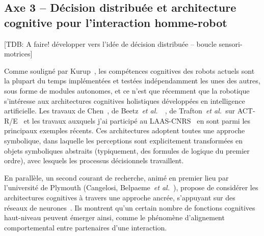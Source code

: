 \documentclass[a4paper]{article}
\newcommand{\etal}{{\textit{et al.~}}}
\begin{document}
\subsection*{Axe 3 -- Décision distribuée et architecture cognitive pour l'interaction homme-robot}

[TDB: A faire! développer vers l'idée de décision distribuée -- boucle
sensori-motrices]

Comme souligné par Kurup~\cite{kurup2012what}, les compétences cognitives des
robots actuels sont la plupart du temps implémentées et testées indépendamment
les unes des autres, sous forme de modules autonomes, et ce n'est que récemment
que la robotique s'intéresse aux architectures cognitives holistiques
développées en intelligence artificielle. Les travaux de Chen~\cite{Chen2010},
de Beetz~\etal~\cite{Beetz2010}, de Trafton~\etal sur
ACT-R/E~\cite{trafton2013act} et les travaux auxquels j'ai participé au
LAAS-CNRS~\cite{lemaignan2014human} en sont parmi les principaux exemples
récents. Ces architectures adoptent toutes une approche symbolique, dans
laquelle les perceptions sont explicitement transformées en objets symboliques
abstraits (typiquement, des formules de logique du premier ordre), avec lesquels
les processus décisionnels travaillent.

En parallèle, un second courant de recherche, animé en premier lieu par
l'université de Plymouth (Cangelosi, Belpaeme~\etal), propose de considérer les
architectures cognitives à travers une approche
ancrée, s'appuyant sur des réseaux de neurones~\cite{morse2010epigenetic,
baxter2013cognitive}. Ils montrent qu'un certain nombre de fonctions cognitives
haut-niveau peuvent émerger ainsi, comme le phénomène d'alignement
comportemental entre partenaires d'une interaction.

\end{document}
